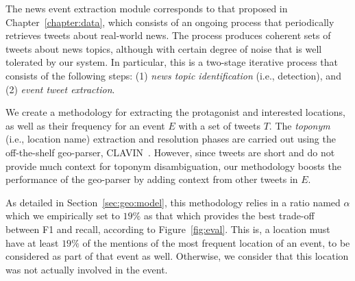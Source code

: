 %
The news event extraction module corresponds to that proposed in
Chapter~\ref{chapter:data}, which consists of an ongoing process that
periodically retrieves tweets about real-world news. 
%
The process produces coherent sets of tweets about news topics, although with
certain degree of noise that is well tolerated by our system. 
%
In particular, this is a two-stage iterative process that consists of the
following steps:
%
(1) {\em news topic identification} (i.e., detection), and 
%
(2) {\em event tweet extraction}. 


\smallskip
{}
%
We create a methodology for extracting the protagonist and interested locations,
as well as their frequency for an event $E$ with a set of tweets $T$.  
%
The {\em toponym} (i.e., location name) extraction and resolution phases are
carried out using the off-the-shelf geo-parser, CLAVIN~\cite{clavin}. 
%
However, since tweets are short and do not provide much context for toponym
disambiguation, our methodology boosts the performance of the geo-parser by
adding context from other tweets in $E$.

As detailed in Section~\ref{sec:geo:model}, this methodology relies in a ratio
named $\alpha$ which we empirically set to $19\%$ as that which provides the
best trade-off between F1 and recall, according to Figure~\ref{fig:eval}. 
%
This is, a location must have at least $19\%$ of the mentions of the most
frequent location of an event, to be considered as part of that event as well.
%
Otherwise, we consider that this location was not actually involved in the
event.